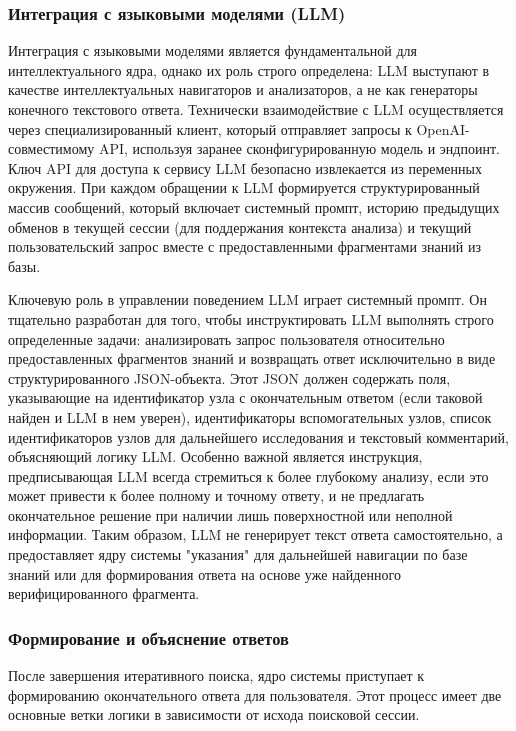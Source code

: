 \subsubsection{Интеграция с языковыми моделями (LLM)}

Интеграция с языковыми моделями является фундаментальной для интеллектуального ядра, однако их роль строго определена: LLM выступают в качестве интеллектуальных навигаторов и анализаторов, а не как генераторы конечного текстового ответа. Технически взаимодействие с LLM осуществляется через специализированный клиент, который отправляет запросы к OpenAI-совместимому API, используя заранее сконфигурированную модель и эндпоинт. Ключ API для доступа к сервису LLM безопасно извлекается из переменных окружения. При каждом обращении к LLM формируется структурированный массив сообщений, который включает системный промпт, историю предыдущих обменов в текущей сессии (для поддержания контекста анализа) и текущий пользовательский запрос вместе с предоставленными фрагментами знаний из базы.

Ключевую роль в управлении поведением LLM играет системный промпт. Он тщательно разработан для того, чтобы инструктировать LLM выполнять строго определенные задачи: анализировать запрос пользователя относительно предоставленных фрагментов знаний и возвращать ответ исключительно в виде структурированного JSON-объекта. Этот JSON должен содержать поля, указывающие на идентификатор узла с окончательным ответом (если таковой найден и LLM в нем уверен), идентификаторы вспомогательных узлов, список идентификаторов узлов для дальнейшего исследования и текстовый комментарий, объясняющий логику LLM. Особенно важной является инструкция, предписывающая LLM всегда стремиться к более глубокому анализу, если это может привести к более полному и точному ответу, и не предлагать окончательное решение при наличии лишь поверхностной или неполной информации. Таким образом, LLM не генерирует текст ответа самостоятельно, а предоставляет ядру системы "указания" для дальнейшей навигации по базе знаний или для формирования ответа на основе уже найденного верифицированного фрагмента.

\subsubsection{Формирование и объяснение ответов}

После завершения итеративного поиска, ядро системы приступает к формированию окончательного ответа для пользователя. Этот процесс имеет две основные ветки логики в зависимости от исхода поисковой сессии.

